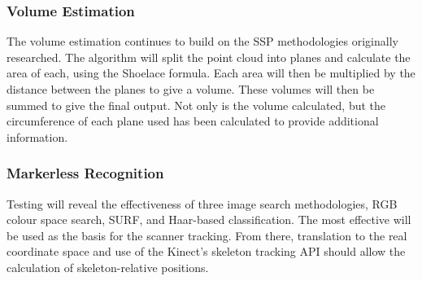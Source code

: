 \subsubsection{Volume Estimation}
The volume estimation continues to build on the SSP methodologies originally researched. The algorithm will split the point cloud into planes and calculate the area of each, using the Shoelace formula. Each area will then be multiplied by the distance between the planes to give a volume. These volumes will then be summed to give the final output. Not only is the volume calculated, but the circumference of each plane used has been calculated to provide additional information.\\

\subsubsection{Markerless Recognition}
Testing will reveal the effectiveness of three image search methodologies, RGB colour space search, SURF, and Haar-based classification. The most effective will be used as the basis for the scanner tracking. From there, translation to the real coordinate space and use of the Kinect's skeleton tracking API should allow the calculation of skeleton-relative positions.
